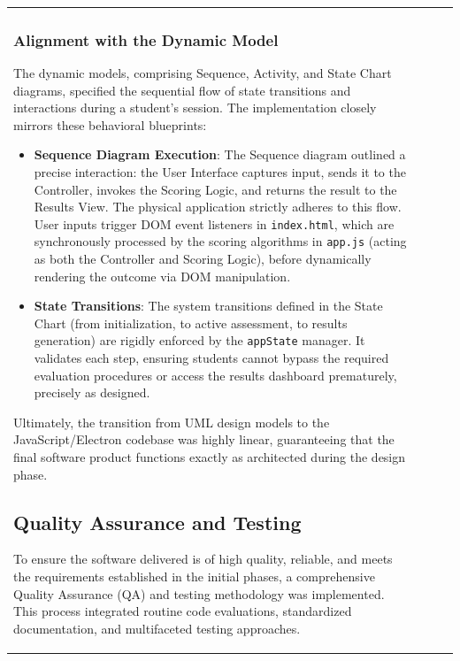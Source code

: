 \documentclass[12pt, a4paper]{article}
\begin{document}
\begin{itemize}[leftmargin=1.5em, itemsep=3pt]
\begin{table}[H]
\begin{tabularx}{\textwidth}{>{\raggedright\arraybackslash}p{0.8cm}>{\raggedright\arraybackslash}p{3.5cm}>{\raggedright\arraybackslash}X>{\raggedright\arraybackslash}p{2.5cm}}
\subsubsection{Alignment with the Dynamic Model}
The dynamic models, comprising Sequence, Activity, and State Chart diagrams, specified the sequential flow of state transitions and interactions during a student's session. The implementation closely mirrors these behavioral blueprints:
\begin{itemize}[leftmargin=1.5em, itemsep=3pt]
    \item \textbf{Sequence Diagram Execution}: The Sequence diagram outlined a precise interaction: the User Interface captures input, sends it to the Controller, invokes the Scoring Logic, and returns the result to the Results View. The physical application strictly adheres to this flow. User inputs trigger DOM event listeners in \texttt{index.html}, which are synchronously processed by the scoring algorithms in \texttt{app.js} (acting as both the Controller and Scoring Logic), before dynamically rendering the outcome via DOM manipulation.
    \item \textbf{State Transitions}: The system transitions defined in the State Chart (from initialization, to active assessment, to results generation) are rigidly enforced by the \texttt{appState} manager. It validates each step, ensuring students cannot bypass the required evaluation procedures or access the results dashboard prematurely, precisely as designed.
\end{itemize}
Ultimately, the transition from UML design models to the JavaScript/Electron codebase was highly linear, guaranteeing that the final software product functions exactly as architected during the design phase.

\subsection{Quality Assurance and Testing}

To ensure the software delivered is of high quality, reliable, and meets the requirements established in the initial phases, a comprehensive Quality Assurance (QA) and testing methodology was implemented. This process integrated routine code evaluations, standardized documentation, and multifaceted testing approaches.


\end{tabularx}
\end{table}
\end{itemize}
\end{document}
